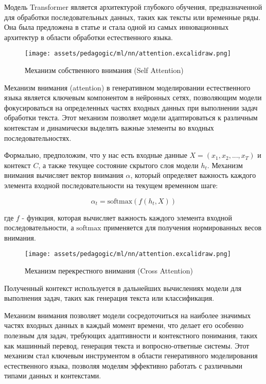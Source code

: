 Модель Transformer является архитектурой
глубокого обучения, предназначенной для
обработки последовательных данных,
таких как тексты или временные ряды.
Она была предложена в статье \cite{vaswani2017attention} 
и стала одной из самых инновационных архитектур
в области обработки естественного языка.


\begin{figure}[h]
    \centering
    \texttt{[image: assets/pedagogic/ml/nn/attention.excalidraw.png]}
    \caption{Механизм собственного внимания (Self Attention) \cite{vaswani2017attention} }
    \label{self_attention}
\end{figure}

Механизм внимания (attention) в генеративном моделировании естественного языка является ключевым компонентом в нейронных сетях, 
позволяющим модели фокусироваться на определенных частях входных данных при выполнении задач обработки текста. 
Этот механизм позволяет модели адаптироваться к различным контекстам и динамически выделять важные элементы во входных последовательностях.

Формально, предположим, что у нас есть входные данные \( X = (x_1, x_2, ..., x_T) \) и контекст \( C \), а также текущее состояние скрытого слоя модели \( h_t \). Механизм внимания вычисляет вектор внимания \( \alpha \), который определяет важность каждого элемента входной последовательности на текущем временном шаге:

\[ \alpha_t = \text{softmax}(f(h_t, X)) \]

где \( f \) - функция, которая вычисляет важность каждого элемента входной последовательности, а \( \text{softmax} \) применяется для получения нормированных весов внимания.


\begin{figure}[h]
    \centering
    \texttt{[image: assets/pedagogic/ml/nn/attention.excalidraw.png]}
    \caption{Механизм перекрестного внимания (Cross Attention) \cite{vaswani2017attention} }
    \label{cross_attention}
\end{figure}


Полученный контекст используется в дальнейших вычислениях модели для выполнения задач, таких как генерация текста или классификация.

Механизм внимания позволяет модели сосредоточиться на наиболее значимых частях входных данных в каждый момент времени, что делает его особенно полезным для задач, требующих адаптивности и контекстного понимания, таких как машинный перевод, генерация текста и вопросно-ответные системы. Этот механизм стал ключевым инструментом в области генеративного моделирования естественного языка, позволяя моделям эффективно работать с различными типами данных и контекстами.






